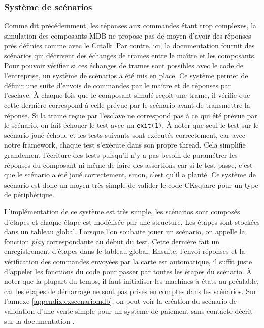 \documentclass[a4paper]{article}
\begin{document}
\subsubsection{Système de scénarios}
\label{sysscenar}

Comme dit précédemment, les réponses aux commandes étant trop complexes, la
simulation des composants MDB ne propose pas de moyen d'avoir des réponses prés
définies comme avec le Cctalk. Par contre, ici, la documentation fournit des
scénarios qui décrivent des échanges de trames entre le maître et les
composants. Pour pouvoir vérifier si ces échanges de trames sont possibles avec
le code de l'entreprise, un système de scénarios a été mis en place. Ce système
permet de définir une suite d'envois de commandes par le maître et de réponses
par l'esclave. À chaque fois que le composant simulé reçoit une trame, il
vérifie que cette dernière correspond à celle prévue par le scénario avant de
transmettre la réponse. Si la trame reçue par l'esclave ne correspond pas à ce
qui été prévue par le scénario, on fait échouer le test avec un \verb|exit(1)|.
À noter que seul le test sur le scénario joué échoue et les tests suivants sont
exécutés correctement, car avec notre framework, chaque test s'exécute dans son
propre thread. Cela simplifie grandement l'écriture des tests puisqu'il n'y a
pas besoin de paramétrer les réponses du composant ni même de faire des
assertions car si le test passe, c'est que le scénario a été joué correctement,
sinon, c'est qu'il a planté. Ce système de scénario est donc un moyen très
simple de valider le code CKsquare pour un type de périphérique.

L'implémentation de ce système est très simple, les scénarios sont composés
d'étapes et chaque étape est modélisée par une structure. Les étapes sont
stockées dans un tableau global. Lorsque l'on souhaite jouer un scénario, on
appelle la fonction \textit{play} correspondante au début du test. Cette dernière
fait un enregistrement d'étapes dans le tableau global. Ensuite, l'envoi
réponses et la vérification des commandes envoyées par la carte est automatique,
il suffit juste d'appeler les fonctions du code pour passer par toutes les
étapes du scénario. À noter que la plupart du temps, il faut initialiser les
machines à états au préalable, car les étapes de démarrage ne sont pas prises en
comptes dans les scénarios. Sur l'annexe \ref{appendix:exscenariomdb}, on peut
voir la création du scénario de validation d'une vente simple pour un système de
paiement sans contacte décrit sur la documentation \cite[169]{mdbdoc}.\\
\end{document}
